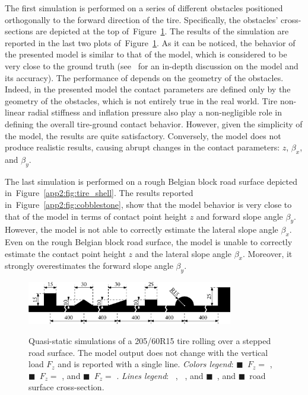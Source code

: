 The first simulation is performed on a series of different obstacles positioned orthogonally to the forward direction of the tire. Specifically, the obstacles' cross-sections are depicted at the top of~Figure~\ref{app2:fig:steps}. The results of the simulation are reported in the last two plots of~Figure~\ref{app2:fig:steps}. As it can be noticed, the behavior of the presented model is similar to that of the \Swift{} model, which is considered to be very close to the ground truth (see~\cite{schmeitz2004semiempirical} for an in-depth discussion on the \Swift{} model and its accuracy). The performance of \Enve{} depends on the geometry of the obstacles. Indeed, in the presented model the contact parameters are defined only by the geometry of the obstacles, which is not entirely true in the real world. Tire non-linear radial stiffness and inflation pressure also play a non-negligible role in defining the overall tire-ground contact behavior. However, given the simplicity of the model, the results are quite satisfactory. Conversely, the \TMEasy{} model does not produce realistic results, causing abrupt changes in the contact parameters: $z$, $\beta_x$, and $\beta_y$.

The last simulation is performed on a rough Belgian block road surface depicted in~Figure~\ref{app2:fig:tire_shell}. The results reported in~Figure~\ref{app2:fig:cobblestone}, show that the \Enve{} model behavior is very close to that of the \Swift{} model in terms of contact point height $z$ and forward slope angle $\beta_y$. However, the \Enve{} model is not able to correctly estimate the lateral slope angle $\beta_x$. Even on the rough Belgian block road surface, the \TMEasy{} model is unable to correctly estimate the contact point height $z$ and the lateral slope angle $\beta_x$. Moreover, it strongly overestimates the forward slope angle $\beta_y$.

\begin{figure}[htb]
  \centering
  \hspace{1.5cm}\includegraphics[width=9.0cm]{./figures/appendix_2/steps_ipe}\\[0.1in]
  \small{}
  \caption{Quasi-static simulations of a 205/60R15 tire rolling over a stepped road surface. The \TMEasy{} model output does not change with the vertical load $F_z$ and is reported with a single line. \emph{Colors legend}: {\color{mycolor1}$\blacksquare$}~$F_z =$ , {\color{mycolor2}$\blacksquare$}~$F_z =$ , and {\color{mycolor3}$\blacksquare$}~$F_z =$ . \emph{Lines legend}: \raisebox{1.0pt}{\textbf{---}}~\Enve{}, \raisebox{1.0pt}{\textbf{--~--}}~\Swift{}, and {\color{mycolor5}$\blacksquare$}~\TMEasy{}, and {\color{black}$\blacksquare$}~road surface cross-section.}
  \label{app2:fig:steps}
\end{figure}

